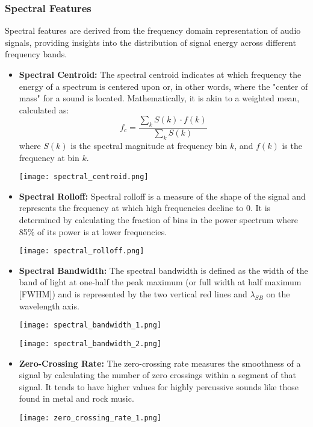 \documentclass[lettersize,journal]{IEEEtran}
\begin{document}
\subsubsection{Spectral Features}
Spectral features are derived from the frequency domain representation of audio signals, providing insights into the distribution of signal energy across different frequency bands.

\begin{itemize}
    \item \textbf{Spectral Centroid:} The spectral centroid indicates at which frequency the energy of a spectrum is centered upon or, in other words, where the "center of mass" for a sound is located. Mathematically, it is akin to a weighted mean, calculated as:
    \[ f_c = \frac{\sum_k S(k) \cdot f(k)}{\sum_k S(k)} \]
    where \( S(k) \) is the spectral magnitude at frequency bin \( k \), and \( f(k) \) is the frequency at bin \( k \).
    \begin{center}
    \texttt{[image: spectral\_centroid.png]}
    \end{center}

    \item \textbf{Spectral Rolloff:} Spectral rolloff is a measure of the shape of the signal and represents the frequency at which high frequencies decline to 0. It is determined by calculating the fraction of bins in the power spectrum where 85\% of its power is at lower frequencies.
    \begin{center}
    \texttt{[image: spectral\_rolloff.png]}
    \end{center}

    \item \textbf{Spectral Bandwidth:} The spectral bandwidth is defined as the width of the band of light at one-half the peak maximum (or full width at half maximum [FWHM]) and is represented by the two vertical red lines and \( \lambda_{SB} \) on the wavelength axis.
    \begin{center}
    \texttt{[image: spectral\_bandwidth\_1.png]}
    \vspace{\baselineskip}

    \texttt{[image: spectral\_bandwidth\_2.png]}
    \end{center}

    \item \textbf{Zero-Crossing Rate:} The zero-crossing rate measures the smoothness of a signal by calculating the number of zero crossings within a segment of that signal. It tends to have higher values for highly percussive sounds like those found in metal and rock music.
    \begin{center}
    \texttt{[image: zero\_crossing\_rate\_1.png]}
    \vspace{\baselineskip}


\end{center}
\end{itemize}
\end{document}
